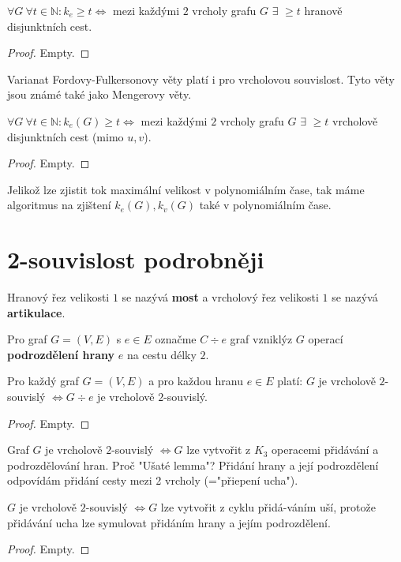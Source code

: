\begin{veta}
	$\forall G \ \forall t \in \mathbb{N}: k_{e} \geq t \Leftrightarrow$ mezi každými $2$ vrcholy grafu $G$ $\exists$ $\geq t$ hranově disjunktních cest.
\end{veta}

\begin{proof}
	Empty.
\end{proof}

Varianat Fordovy-Fulkersonovy věty platí i pro vrcholovou souvislost. Tyto věty jsou známé také jako Mengerovy věty.

\begin{veta}
	$\forall G \ \forall t \in \mathbb{N}: k_{e}(G) \geq t \Leftrightarrow$ mezi každými $2$ vrcholy grafu $G$ $\exists$ $\geq t$ vrcholově disjunktních cest (mimo $u,v$).
\end{veta}

\begin{proof}
	Empty.
\end{proof}

Jelikož lze zjistit tok maximální velikost v polynomiálním čase, tak máme algoritmus na zjištení $k_{e}(G), k_{v}(G)$ také v polynomiálním čase.

\section{2-souvislost podrobněji}

\begin{definice}
	Hranový řez velikosti $1$ se nazývá \textbf{most} a vrcholový řez velikosti  $1$ se nazývá \textbf{artikulace}.
\end{definice}

Pro graf $G=(V,E)$ s $e \in E$ označme $C \div e$ graf vzniklýz $G$ operací \textbf{podrozdělení hrany} $e$ na cestu délky $2$.

\begin{lemma}
	Pro každý graf $G=(V,E)$ a pro každou hranu $e \in E$ platí: $G$ je vrcholově $2$-souvislý $\Leftrightarrow G \div e$ je vrcholově $2$-souvislý.
\end{lemma}

\begin{proof}
	Empty.
\end{proof}

\begin{veta}
	Graf $G$ je vrcholově $2$-souvislý $\Leftrightarrow G$ lze vytvořit z $K_{3}$ operacemi přidávání a podrozdělování hran. Proč "Ušaté lemma"? Přidání hrany a její podrozdělení odpovídám přidání cesty mezi 2 vrcholy (="přiepení ucha").
\end{veta}

\begin{veta}
	$G$ je vrcholově $2$-souvislý $\Leftrightarrow G$ lze vytvořit z cyklu přidá-\newline váním uší, protože přidávání ucha lze symulovat přidáním hrany a jejím podrozdělení.
\end{veta}

\begin{proof}
	Empty.
\end{proof}
